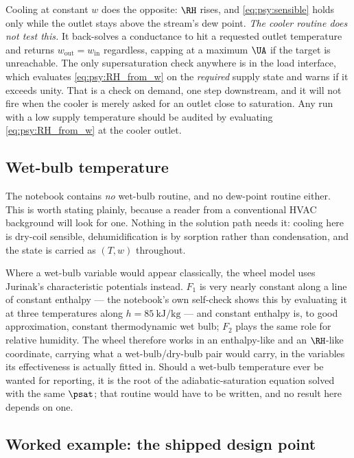 Cooling at constant $w$ does the opposite: $\RH$ rises, and \eqref{eq:psy:sensible} holds only while
the outlet stays above the stream's dew point. \emph{The cooler routine does not test this.} It
back-solves a conductance to hit a requested outlet temperature and returns $w_{\mathrm{out}} =
w_{\mathrm{in}}$ regardless, capping at a maximum $\UA$ if the target is unreachable. The only
supersaturation check anywhere is in the load interface, which evaluates \eqref{eq:psy:RH_from_w} on
the \emph{required} supply state and warns if it exceeds unity. That is a check on demand, one step
downstream, and it will not fire when the cooler is merely asked for an outlet close to saturation.
Any run with a low supply temperature should be audited by evaluating \eqref{eq:psy:RH_from_w} at
the cooler outlet.

\subsection{Wet-bulb temperature}
\label{sec:psy:wetbulb}

The notebook contains \emph{no} wet-bulb routine, and no dew-point routine either. This is worth
stating plainly, because a reader from a conventional HVAC background will look for one. Nothing in
the solution path needs it: cooling here is dry-coil sensible, dehumidification is by sorption
rather than condensation, and the state is carried as $(T,w)$ throughout.

Where a wet-bulb variable would appear classically, the wheel model uses Jurinak's characteristic
potentials instead. $F_1$ is very nearly constant along a line of constant enthalpy --- the
notebook's own self-check shows this by evaluating it at three temperatures along $h =
\SI{85}{\kilo\joule\per\kilogram}$ --- and constant enthalpy is, to good approximation, constant
thermodynamic wet bulb; $F_2$ plays the same role for relative humidity. The wheel therefore works
in an enthalpy-like and an $\RH$-like coordinate, carrying what a wet-bulb/dry-bulb pair would
carry, in the variables its effectiveness is actually fitted in. Should a wet-bulb temperature ever
be wanted for reporting, it is the root of the adiabatic-saturation equation solved with the same
$\psat$; that routine would have to be written, and no result here depends on one.

\subsection{Worked example: the shipped design point}
\label{sec:psy:example}


